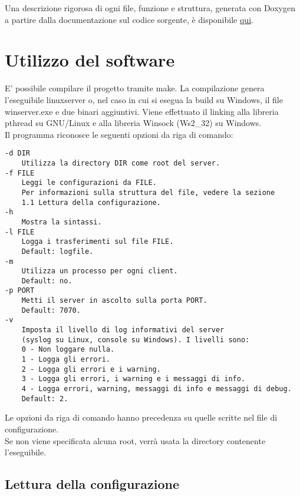 \documentclass{article}
\begin{document}
\tableofcontents

\vspace{15mm} %
Una descrizione rigorosa di ogni file, funzione e struttura, generata con Doxygen a partire dalla 
documentazione sul codice sorgente, è disponibile \href{html/index.html}{qui}. 

\newpage

\section{Utilizzo del software}

E' possibile compilare il progetto tramite make. La compilazione genera l'eseguibile linuxserver o,
nel caso in cui si esegua la build su Windows, il file winserver.exe e due binari aggiuntivi.
Viene effettuato il linking alla libreria pthread su GNU/Linux e alla libreria Winsock (Ws2\_32) su Windows.\\
Il programma riconosce le seguenti opzioni da riga di comando:\\
\begin{lstlisting}
-d DIR
    Utilizza la directory DIR come root del server.
-f FILE 
    Leggi le configurazioni da FILE. 
    Per informazioni sulla struttura del file, vedere la sezione 
    1.1 Lettura della configurazione.
-h
    Mostra la sintassi.
-l FILE
    Logga i trasferimenti sul file FILE. 
    Default: logfile.
-m 
    Utilizza un processo per ogni client. 
    Default: no.
-p PORT
    Metti il server in ascolto sulla porta PORT. 
    Default: 7070.
-v
    Imposta il livello di log informativi del server 
    (syslog su Linux, console su Windows). I livelli sono:
    0 - Non loggare nulla.
    1 - Logga gli errori.
    2 - Logga gli errori e i warning.
    3 - Logga gli errori, i warning e i messaggi di info.
    4 - Logga errori, warning, messaggi di info e messaggi di debug.
    Default: 2.

\end{lstlisting}
Le opzioni da riga di comando hanno precedenza su quelle scritte nel file di configurazione.\\
Se non viene specificata alcuna root, verrà usata la directory contenente l'eseguibile.

\subsection{Lettura della configurazione}
\end{document}
